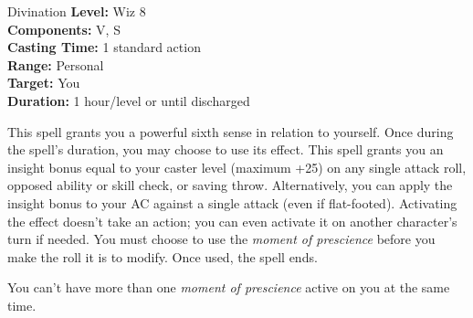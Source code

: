{Divination}
{
	\textbf{Level:}
	Wiz 8\\
	\textbf{Components:}
	V, S\\
	\textbf{Casting Time:}
	1 standard action\\
	\textbf{Range:}
	Personal\\
	\textbf{Target:}
	You\\
	\textbf{Duration:}
	1 hour/level or until discharged\\
}
{
	This spell grants you a powerful sixth sense in relation to yourself. Once during the spell's duration, you may choose to use its effect. This spell grants you an insight bonus equal to your caster level (maximum +25) on any single attack roll, opposed ability or skill check, or saving throw. Alternatively, you can apply the insight bonus to your AC against a single attack (even if flat-footed). Activating the effect doesn't take an action; you can even activate it on another character's turn if needed. You must choose to use the \emph{moment of prescience} before you make the roll it is to modify. Once used, the spell ends.

	You can't have more than one \emph{moment of prescience} active on you at the same time.

}
